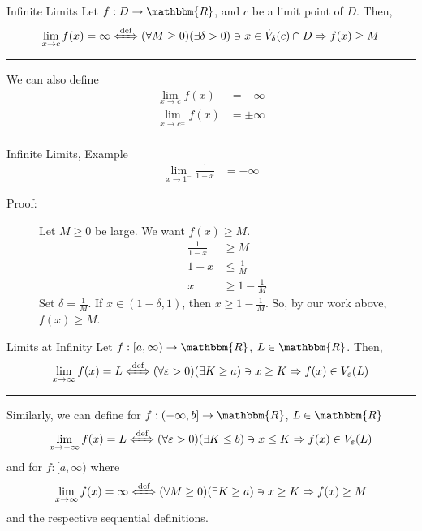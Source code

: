 \documentclass[10pt]{extarticle}
\newcommand{\R}{\mathbbm{R}}
\begin{document}
  \begin{problem}{Infinite Limits}
    Let $f: D\rightarrow \R$, and $c$ be a limit point of $D$. Then,
    \begin{align*}
      \lim_{x\rightarrow c}f(x) = \infty \xLeftrightarrow{\text{def}} (\forall M \geq 0)(\exists \delta > 0) \ni x\in \dot{V}_{\delta}(c)\cap D \Rightarrow f(x) \geq M
    \end{align*}
    \vspace{4pt}
    \rule{\textwidth}{0.4pt}
    \vspace{4pt}
    We can also define
    \begin{align*}
      \lim_{x\rightarrow c}f(x) &= -\infty\\
      \lim_{x\rightarrow c^{\pm}}f(x) &= \pm \infty\\
    \end{align*}
  \end{problem}
  \begin{problem}{Infinite Limits, Example}
    \begin{align*}
      \lim_{x\rightarrow 1^{-}}\frac{1}{1-x} &= -\infty
    \end{align*}
    \begin{description}
      \item[Proof:] Let $M\geq 0$ be large. We want $f(x) \geq M$.
        \begin{align*}
          \frac{1}{1-x} &\geq M\\
          1-x &\leq \frac{1}{M}\\
          x &\geq 1-\frac{1}{M}
        \end{align*}
        Set $\delta = \frac{1}{M}$. If $x\in (1-\delta,1)$, then $x\geq 1-\frac{1}{M}$. So, by our work above, $f(x) \geq M$.
    \end{description}
  \end{problem}
  \begin{problem}{Limits at Infinity}
    Let $f: [a,\infty) \rightarrow \R$, $L\in\R$. Then,
    \begin{align*}
      \lim_{x\rightarrow \infty}f(x) = L \xLeftrightarrow{\text{def}} (\forall \varepsilon > 0)(\exists K \geq a) \ni x\geq K \Rightarrow f(x)\in V_{\varepsilon}(L)
    \end{align*}
    \vspace{4pt}
    \rule{\textwidth}{0.4pt}
    \vspace{4pt}
    Similarly, we can define for $f: (-\infty,b] \rightarrow \R$, $L\in \R$
    \begin{align*}
      \lim_{x\rightarrow -\infty} f(x) = L \xLeftrightarrow{\text{def}} (\forall \varepsilon > 0)(\exists K\leq b) \ni x\leq K \Rightarrow f(x)\in V_{\varepsilon}(L)
    \end{align*}
    and for $f: [a,\infty)$ where
    \begin{align*}
      \lim_{x\rightarrow\infty}f(x) = \infty \xLeftrightarrow{\text{def}} (\forall M \geq 0)(\exists K\geq a) \ni x\geq K \Rightarrow f(x) \geq M
    \end{align*}
    and the respective sequential definitions.
  \end{problem}
\end{document}
